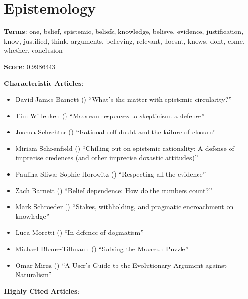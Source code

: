 \documentclass[
  10pt,
  letterpaper,
  DIV=11,
  numbers=noendperiod,
  twoside]{scrartcl}
\providecommand{\tightlist}{%
  \setlength{\itemsep}{0pt}\setlength{\parskip}{0pt}}\usepackage{longtable,booktabs,array}
\begin{document}
\section{Epistemology}\label{epistemology}

\textbf{Terms}: one, belief, epistemic, beliefs, knowledge, believe,
evidence, justification, know, justified, think, arguments, believing,
relevant, doesnt, knows, dont, come, whether, conclusion

\textbf{Score}: 0.9986443

\textbf{Characteristic Articles}:

\begin{itemize}
\tightlist
\item
  David James Barnett () ``What's
  the matter with epistemic circularity?''
\item
  Tim Willenken () ``Moorean
  responses to skepticism: a defense''
\item
  Joshua Schechter () ``Rational
  self-doubt and the failure of closure''
\item
  Miriam Schoenfield ()
  ``Chilling out on epistemic rationality: A defense of imprecise
  credences (and other imprecise doxastic attitudes)''
\item
  Paulina Sliwa; Sophie Horowitz
  () ``Respecting all the
  evidence''
\item
  Zach Barnett () ``Belief
  dependence: How do the numbers count?''
\item
  Mark Schroeder () ``Stakes,
  withholding, and pragmatic encroachment on knowledge''
\item
  Luca Moretti () ``In defence of
  dogmatism''
\item
  Michael Blome-Tillmann ()
  ``Solving the Moorean Puzzle''
\item
  Omar Mirza () ``A User's Guide
  to the Evolutionary Argument against Naturalism''
\end{itemize}

\textbf{Highly Cited Articles}:
\end{document}
